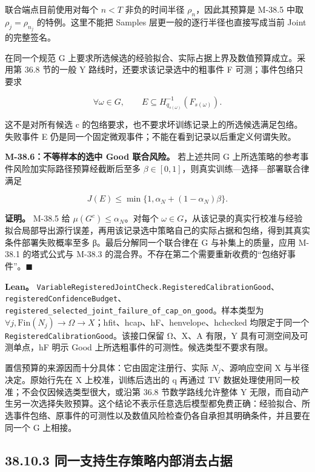 \documentclass[
  11pt,
  oneside]{book}
\begin{document}
联合端点目前使用对每个 \(n<T\) 非负的时间半径 \(\rho_n\)，因此其预算是 M-38.5 中取 \(\rho_j=\rho_{n_j}\) 的特例。这里不能把 Samples 层更一般的逐行半径也直接写成当前 Joint 的完整签名。

在同一个规范 G 上要求所选候选的经验拟合、实际占据上界及数值预算成立。采用第 36.8 节的一般 Y 路线时，还要求该记录选中的粗事件 F 可测；事件包络只要求

\[\forall\omega\in G,\qquad
E\subseteq H_{q_{s(\omega)}}^{-1}(F_{s(\omega)}).\]

这不是对所有候选 c 的包络要求，也不要求坏训练记录上的所选候选满足包络。失败事件 E 仍是同一个固定微观事件；不能在看到记录以后重定义何谓失败。

\hypertarget{m-38-6}{}\label{m-38-6}

\textbf{M-38.6：不等样本的选中 Good 联合风险。} 若上述共同 G 上所选策略的参考事件风险加实际路径预算经截断后至多 \(\beta\in[0,1]\)，则真实训练---选择---部署联合律满足

\[J(E)\le \min\{1,\alpha_N+(1-\alpha_N)\beta\}.\]

\textbf{证明。} M-38.5 给 \(\mu(G^c)\le\alpha_N\)。对每个 \(\omega\in G\)，从该记录的真实行校准与经验拟合局部导出源行误差，再用该记录选中策略自己的实际占据和包络，得到其真实条件部署失败概率至多 β。最后分解同一个联合律在 G 与补集上的质量，应用 M-38.1 的塔式公式与 M-38.3 的混合界。不存在第二个需要重新收费的``包络好事件''。\(\blacksquare\)

\textbf{Lean。} \nolinkurl{VariableRegisteredJointCheck.RegisteredCalibrationGood}、\nolinkurl{registeredConfidenceBudget}、\nolinkurl{registered_selected_joint_failure_of_cap_on_good}。样本类型为 \(\forall j,\mathrm{Fin}(N_j)\to\Omega\to X\)；hfit、hcap、hF、henvelope、hchecked 均限定于同一个 \nolinkurl{RegisteredCalibrationGood}。该接口保留 Ω、X、A 有限，Y 具有可测空间及可测单点，hF 明示 Good 上所选粗事件的可测性。候选类型不要求有限。

置信预算的来源因而十分具体：它由固定注册行、实际 \(N_j\)、源响应空间 X 与半径决定。原始行先在 X 上校准，训练后选出的 q 再通过 TV 数据处理使用同一校准；不会仅因候选类型很大，或沿第 36.8 节数学路线允许整体 Y 无限，而自动产生另一次选择失败预算。这个结论不表示任意选后模型都免费正确：经验拟合、所选事件包络、原事件的可测性以及数值风险检查仍各自承担其明确条件，并且要在同一个 G 上相接。

\subsection{38.10.3 同一支持生存策略内部消去占据}\label{ux540cux4e00ux652fux6301ux751fux5b58ux7b56ux7565ux5185ux90e8ux6d88ux53bbux5360ux636e}
\end{document}
